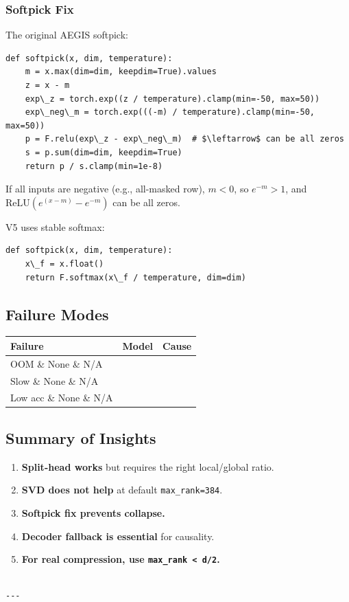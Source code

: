 \subsubsection{Softpick Fix}

The original AEGIS softpick:

\begin{lstlisting}
def softpick(x, dim, temperature):
    m = x.max(dim=dim, keepdim=True).values
    z = x - m
    exp\_z = torch.exp((z / temperature).clamp(min=-50, max=50))
    exp\_neg\_m = torch.exp(((-m) / temperature).clamp(min=-50, max=50))
    p = F.relu(exp\_z - exp\_neg\_m)  # $\leftarrow$ can be all zeros
    s = p.sum(dim=dim, keepdim=True)
    return p / s.clamp(min=1e-8)
\end{lstlisting}

If all inputs are negative (e.g., all-masked row), $m < 0$, so 
$e^{-m} > 1$, and $\text{ReLU}(e^{(x-m)} - e^{-m})$ can be all zeros.

V5 uses stable softmax:

\begin{lstlisting}
def softpick(x, dim, temperature):
    x\_f = x.float()
    return F.softmax(x\_f / temperature, dim=dim)
\end{lstlisting}

\subsection{Failure Modes}

\begin{table}[H]
\centering
\small
\begin{tabular}{lll}
\toprule
\textbf{Failure} & \textbf{Model} & \textbf{Cause} \\
\midrule
OOM \& None \& N/A \\
Slow \& None \& N/A \\
Low acc \& None \& N/A \\
\bottomrule
\end{tabular}
\end{table}

\subsection{Summary of Insights}

\begin{enumerate}
\item \textbf{Split-head works} but requires the right local/global ratio.
\item \textbf{SVD does not help} at default \texttt{max\_rank=384}.
\item \textbf{Softpick fix prevents collapse.}
\item \textbf{Decoder fallback is essential} for causality.
\item \textbf{For real compression, use \texttt{max\_rank \textless{} d/2}.}
\end{enumerate}
\begin{lstlisting}

---
\end{lstlisting}